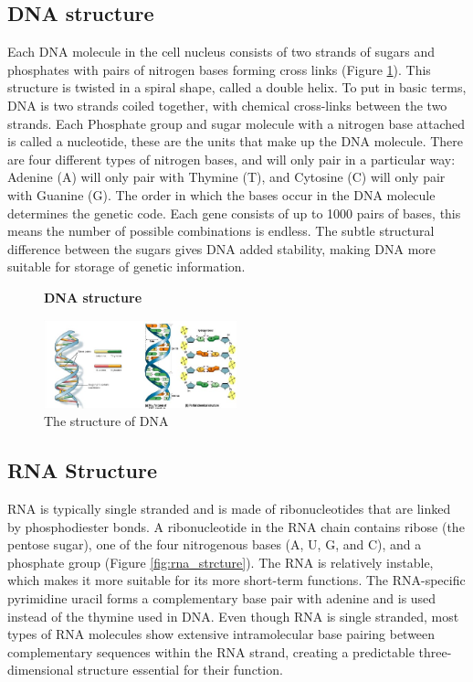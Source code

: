 \subsection{DNA structure}
Each DNA molecule in the cell nucleus consists of two strands of sugars and phosphates with pairs of nitrogen bases forming cross links (Figure \ref{fig:dna_strcture}). This structure is twisted in a spiral shape, called a double helix. To put in basic terms, DNA is two strands coiled together, with chemical cross-links between the two strands. Each Phosphate group and sugar molecule with a nitrogen base attached is called a nucleotide, these are the units that make up the DNA molecule. There are four different types of nitrogen bases, and will only pair in a particular way: 
Adenine (A) will only pair with Thymine (T), and Cytosine (C) will only pair with Guanine (G). The order in which the bases occur in the DNA molecule determines the genetic code. Each gene consists of up to 1000 pairs of bases, this means the number of possible combinations is endless. The subtle structural difference between the sugars gives DNA added stability, making DNA more suitable for storage of genetic information.

\begin{figure}[h!]
	  \centering
	      	\caption{\textbf{DNA structure}}
	      	\label{fig:dna_strcture}

    \includegraphics[width=0.5\textwidth]{background figures/dnastructure.jpg}
    	\caption*{The structure of DNA \cite{figDNAStructure}}
    	
\end{figure}

\subsection{RNA Structure}
RNA is typically single stranded and is made of ribonucleotides that are linked by phosphodiester bonds. A ribonucleotide in the RNA chain contains ribose (the pentose sugar), one of the four nitrogenous bases (A, U, G, and C), and a phosphate group (Figure \ref{fig:rna_strcture}). The RNA is relatively instable, which makes it more suitable for its more short-term functions. The RNA-specific pyrimidine uracil forms a complementary base pair with adenine and is used instead of the thymine used in DNA. Even though RNA is single stranded, most types of RNA molecules show extensive intramolecular base pairing between complementary sequences within the RNA strand, creating a predictable three-dimensional structure essential for their function.

